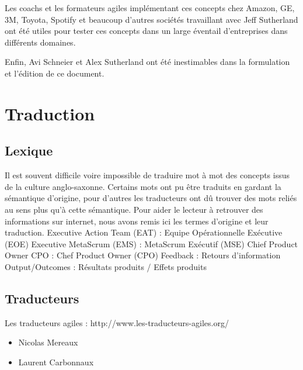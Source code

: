 \documentclass[12pt,a4paper,parskip=full]{scrartcl}
\begin{document}
Les coachs et les formateurs agiles implémentant ces concepts chez Amazon, GE, 3M,
Toyota, Spotify et beaucoup d'autres sociétés travaillant avec Jeff Sutherland ont été utiles
pour tester ces concepts dans un large éventail d'entreprises dans différents domaines.

Enfin, Avi Schneier et Alex Sutherland ont été inestimables dans la formulation 
et l'édition de ce document.

\pagebreak

\printbibliography

\pagebreak

\section{Traduction}
\subsection{Lexique}
Il est souvent difficile voire impossible de traduire mot à mot des concepts issus de la
culture anglo-saxonne. Certains mots ont pu être traduits en gardant la sémantique
d’origine, pour d’autres les traducteurs ont dû trouver des mots reliés au sens plus qu’à
cette sémantique. Pour aider le lecteur à retrouver des informations sur internet, nous
avons remis ici les termes d’origine et leur traduction.
Executive Action Team (EAT) : Equipe Opérationnelle Exécutive (EOE)
Executive MetaScrum (EMS) : MetaScrum Exécutif (MSE)
Chief Product Owner CPO : Chef Product Owner (CPO)
Feedback : Retours d’information
Output/Outcomes : Résultats produits / Effets produits
\subsection{Traducteurs}
Les traducteurs agiles : http://www.les-traducteurs-agiles.org/
\begin{itemize}
\item Nicolas Mereaux
\item Laurent Carbonnaux
\end{itemize}
\end{document}
